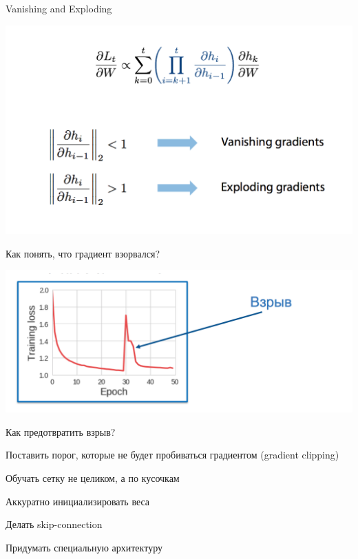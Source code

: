 \documentclass[notes,12pt, aspectratio=169]{beamer}
\newenvironment{wideitemize}{\itemize\addtolength{\itemsep}{10pt}}{\enditemize}
\begin{document}
\begin{frame}{Vanishing and Exploding}
\begin{center}
	\includegraphics[width=.9\linewidth]{rnn8.png}
\end{center}
\end{frame}


\begin{frame}{Как понять, что градиент взорвался?}
\begin{center}
	\includegraphics[width=.9\linewidth]{rnn9.png}
\end{center}
\end{frame}

\begin{frame}{Как предотвратить взрыв?}
\begin{wideitemize} 
\item Поставить порог, которые не будет пробиваться градиентом  (gradient clipping)

\item  Обучать сетку не целиком, а по кусочкам 

\item Аккуратно инициализировать веса

\item Делать skip-connection 

\item  Придумать специальную архитектуру 
\end{wideitemize} 
\end{frame}
\end{document}
